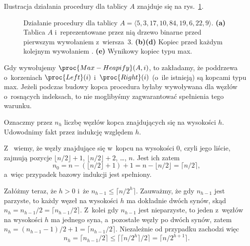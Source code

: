 
\exercise %
Ilustracja działania procedury  dla tablicy $A$ znajduje się na rys.\ \ref{fig:6.3-1}.
\begin{figure}[!ht]
	\centering 
	\caption{Działanie procedury  dla tablicy $A=\langle5,3,17,10,84,19,6,22,9\rangle$.
{\sffamily\bfseries(a)} Tablica $A$ i~reprezentowane przez nią drzewo binarne przed pierwszym wywołaniem  z~wiersza~3.
{\sffamily\bfseries(b)\nbendash(d)} Kopiec przed każdym kolejnym wywołaniem .
{\sffamily\bfseries(e)} Wynikowy kopiec typu max.} \label{fig:6.3-1}
\end{figure}

\exercise %
Gdy wywołujemy $\proc{Max-Heapify}(A,i)$, to zakładamy, że poddrzewa o~korzeniach $\proc{Left}(i)$ i~$\proc{Right}(i)$ (o~ile istnieją) są kopcami typu max.
Jeżeli podczas budowy kopca procedura  byłaby wywoływana dla węzłów o~rosnących indeksach, to nie moglibyśmy zagwarantować spełnienia tego warunku.

\exercise %
Oznaczmy przez $n_h$ liczbę węzłów kopca znajdujących się na wysokości $h$.
Udowodnimy fakt przez indukcję względem $h$.

Z~ wiemy, że węzły znajdujące się w~kopcu na wysokości 0, czyli jego liście, zajmują pozycje $\lfloor n/2\rfloor+1$, $\lfloor n/2\rfloor+2$, \dots, $n$.
Jest ich zatem
\[
    n_0 = n-(\lfloor n/2\rfloor+1)+1 = n-\lfloor n/2\rfloor = \lceil n/2\rceil,
\]
a~więc przypadek bazowy indukcji jest spełniony.

Załóżmy teraz, że $h>0$ i~że $n_{h-1}\le\lceil n/2^h\rceil$.
Zauważmy, że gdy $n_{h-1}$ jest parzyste, to każdy węzeł na wysokości $h$ ma dokładnie dwóch synów, skąd $n_h=n_{h-1}/2=\lceil n_{h-1}/2\rceil$.
Z~kolei gdy $n_{h-1}$ jest nieparzyste, to jeden z~węzłów na wysokości $h$ ma jednego syna, a~pozostałe węzły po dwóch synów, zatem $n_h=(n_{h-1}-1)/2+1=\lceil n_{h-1}/2\rceil$.
Niezależnie od przypadku zachodzi więc
\[
    n_h = \lceil n_{h-1}/2\rceil \le \bigl\lceil\lceil n/2^h\rceil/2\bigr\rceil = \lceil n/2^{h+1}\rceil.
\]
